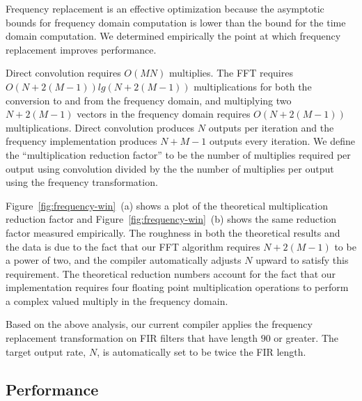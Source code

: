 Frequency replacement is an effective optimization because the asymptotic bounds for 
frequency domain computation is lower than the bound for the time domain computation. 
We determined empirically the point at which frequency replacement improves performance.
  
Direct convolution requires $O(MN)$ multiplies. 
The FFT requires $O(N+2(M-1))lg(N+2(M-1))$ multiplications for both the
conversion to and from the frequency domain, and multiplying two $N+2(M-1)$
vectors in the frequency domain requires $O(N+2(M-1))$ multiplications. 
Direct convolution produces $N$ outputs per iteration and the frequency implementation 
produces $N+M-1$ outputs every iteration. 
We define the ``multiplication reduction factor''
to be the number of multiplies required per output using convolution divided by the 
the number of multiplies per output using the frequency transformation.

Figure~\ref{fig:frequency-win}~(a) shows a plot of the theoretical multiplication reduction factor
and Figure~\ref{fig:frequency-win}~(b) shows the same reduction factor measured empirically. 
The roughness in both the theoretical results and the data is due to the fact that
our FFT algorithm requires $N+2(M-1)$ to be a power of two, and the compiler
automatically adjusts $N$ upward to satisfy this requirement. The theoretical 
reduction numbers account for the fact that our implementation requires four 
floating point multiplication operations to perform a complex valued multiply 
in the frequency domain.

Based on the above analysis, our current compiler applies the frequency replacement
transformation on FIR filters that have length $90$ or greater. The target output
rate, $N$, is automatically set to be twice the FIR length.

\subsection{Performance}



